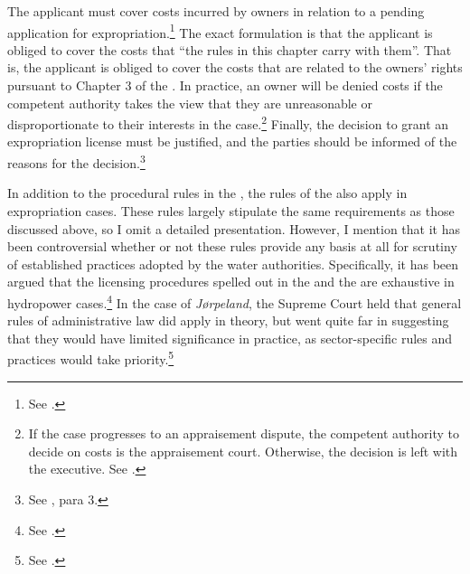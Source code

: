 The applicant must cover costs incurred by owners in relation to a pending application for expropriation.\footnote{See \cite[15]{ea59}.} The exact formulation is that the applicant is obliged to cover the costs that ``the rules in this chapter carry with them''. That is, the applicant is obliged to cover the costs that are related to the owners' rights pursuant to Chapter 3 of the \cite{ea59}. In practice, an owner will be denied costs if the competent authority takes the view that they are unreasonable or disproportionate to their interests in the case.\footnote{If the case progresses to an appraisement dispute, the competent authority to decide on costs is the appraisement court. Otherwise, the decision is left with the executive. See \cite[15]{ea59}.} Finally, the decision to grant an expropriation license must be justified, and the parties should be informed of the reasons for the decision.\footnote{See \cite[12]{ea59}, para 3.}


In addition to the procedural rules in the \cite{ea59}, the rules of the \cite{paa67} also apply in expropriation cases. These rules largely stipulate the same requirements as those discussed above, so I omit a detailed presentation. However, I mention that it has been controversial whether or not these rules provide any basis at all for scrutiny of established practices adopted by the water authorities. Specifically, it has been argued that the licensing procedures spelled out in the \cite{wra00} and the \cite{wra17} are exhaustive in hydropower cases.\footnote{See \cite{jorpeland11a}.} In the case of {\it Jørpeland}, the Supreme Court held that general rules of administrative law did apply in theory, but went quite far in suggesting that they would have limited significance in practice, as sector-specific rules and practices would take priority.\footnote{See \cite{jorpeland11}.}

